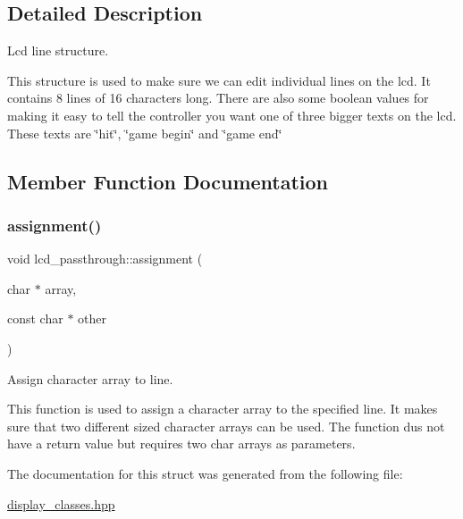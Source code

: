 \subsection{Detailed Description}
Lcd line structure. 

This structure is used to make sure we can edit individual lines on the lcd. It contains 8 lines of 16 characters long. There are also some boolean values for making it easy to tell the controller you want one of three bigger texts on the lcd. These texts are \char`\"{}hit\char`\"{}, \char`\"{}game begin\char`\"{} and \char`\"{}game end\char`\"{} 

\subsection{Member Function Documentation}
\hypertarget{structlcd__passthrough_a74c4254fef0e0e422ac0e078d7824c3a}{}\label{structlcd__passthrough_a74c4254fef0e0e422ac0e078d7824c3a} 
\subsubsection{\texorpdfstring{assignment()}{assignment()}}
{\footnotesize\ttfamily void lcd\+\_\+passthrough\+::assignment (\begin{DoxyParamCaption}\item[{char $\ast$}]{array,  }\item[{const char $\ast$}]{other }\end{DoxyParamCaption})\hspace{0.3cm}{\ttfamily [inline]}}



Assign character array to line. 

This function is used to assign a character array to the specified line. It makes sure that two different sized character arrays can be used. The function dus not have a return value but requires two char arrays as parameters. 

The documentation for this struct was generated from the following file\+:\begin{DoxyCompactItemize}
\item 
\hyperlink{display__classes_8hpp}{display\+\_\+classes.\+hpp}\end{DoxyCompactItemize}
